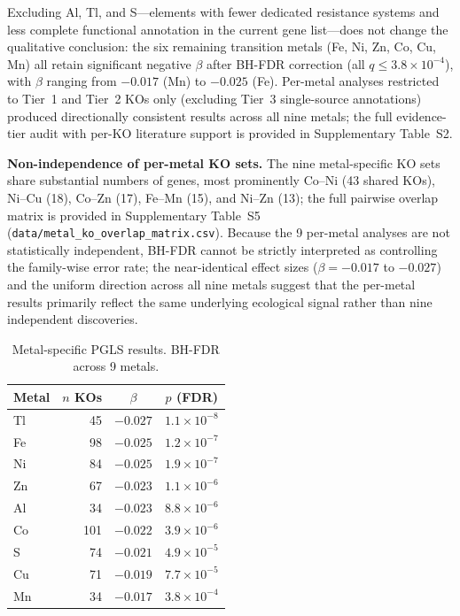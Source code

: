 \documentclass[times]{zHenriquesLab-StyleBioRxiv}
\begin{document}
Excluding Al, Tl, and S---elements with fewer dedicated resistance systems and
less complete functional annotation in the current gene list---does not change
the qualitative conclusion: the six remaining transition metals (Fe, Ni, Zn, Co,
Cu, Mn) all retain significant negative $\beta$ after BH-FDR correction (all
$q \leq 3.8 \times 10^{-4}$), with $\beta$ ranging from $-0.017$ (Mn) to
$-0.025$ (Fe). Per-metal analyses restricted to Tier~1 and Tier~2 KOs only
(excluding Tier~3 single-source annotations) produced directionally consistent
results across all nine metals; the full evidence-tier audit with per-KO literature
support is provided in Supplementary Table~S2.

\textbf{Non-independence of per-metal KO sets.} The nine metal-specific KO sets
share substantial numbers of genes, most prominently Co--Ni (43 shared KOs),
Ni--Cu (18), Co--Zn (17), Fe--Mn (15), and Ni--Zn (13); the full pairwise
overlap matrix is provided in Supplementary Table~S5
(\texttt{data/metal\_ko\_overlap\_matrix.csv}). Because the 9 per-metal analyses
are not statistically independent, BH-FDR cannot be strictly interpreted as
controlling the family-wise error rate; the near-identical effect sizes
($\beta = -0.017$ to $-0.027$) and the uniform direction across all nine metals
suggest that the per-metal results primarily reflect the same underlying
ecological signal rather than nine independent discoveries.


\begin{table}[htbp]
\caption{Metal-specific PGLS results. BH-FDR across 9 metals.}
\label{tab:5}
\centering
\small
\begin{tabular}{lrcc}
\toprule
Metal & $n$ KOs & $\beta$ & $p$ (FDR) \\
\midrule
Tl & 45 & $-0.027$ & $1.1 \times 10^{-8}$ \\
Fe & 98 & $-0.025$ & $1.2 \times 10^{-7}$ \\
Ni & 84 & $-0.025$ & $1.9 \times 10^{-7}$ \\
Zn & 67 & $-0.023$ & $1.1 \times 10^{-6}$ \\
Al & 34 & $-0.023$ & $8.8 \times 10^{-6}$ \\
Co & 101 & $-0.022$ & $3.9 \times 10^{-6}$ \\
S  & 74 & $-0.021$ & $4.9 \times 10^{-5}$ \\
Cu & 71 & $-0.019$ & $7.7 \times 10^{-5}$ \\
Mn & 34 & $-0.017$ & $3.8 \times 10^{-4}$ \\
\bottomrule
\end{tabular}
\end{table}
\end{document}

